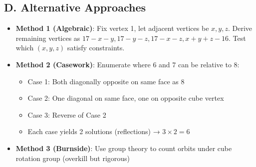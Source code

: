 \documentclass[]{article}
\begin{document}
\begin{techniquesbox}
\subsection*{D. Alternative Approaches}
\begin{itemize}[leftmargin=*]
    \item \textbf{Method 1 (Algebraic)}: Fix vertex 1, let adjacent vertices be $x, y, z$. Derive remaining vertices as $17-x-y, 17-y-z, 17-x-z, x+y+z-16$. Test which $(x,y,z)$ satisfy constraints.
    
    \item \textbf{Method 2 (Casework)}: Enumerate where 6 and 7 can be relative to 8:
    \begin{itemize}
        \item Case 1: Both diagonally opposite on same face as 8
        \item Case 2: One diagonal on same face, one on opposite cube vertex  
        \item Case 3: Reverse of Case 2
        \item Each case yields 2 solutions (reflections) → $3 \times 2 = 6$
    \end{itemize}
    
    \item \textbf{Method 3 (Burnside)}: Use group theory to count orbits under cube rotation group (overkill but rigorous)
\end{itemize}
\end{techniquesbox}
\end{document}
